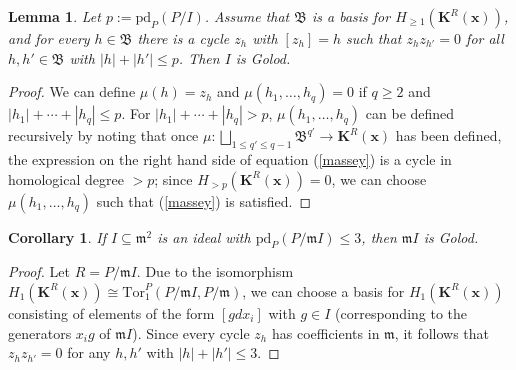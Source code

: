 \documentclass[10pt,reqno]{amsart}
\newtheorem{lemma}[subsection]{Lemma}
\newtheorem{corollary}[subsection]{Corollary}
\theoremstyle{definition}
\theoremstyle{remark}
\numberwithin{equation}{section}
\newcommand{\m}{\mathfrak m}
\numberwithin{equation}{section}
\begin{document}
\begin{lemma}\label{trivialmassey1}
Let $p:=\mathrm{pd}_P(P/I)$. Assume that $\mathfrak B$ is a basis for $H_{\ge 1}(\mathbf{K}^{R}(\mathbf{x}))$, and for every $h\in \mathfrak B$ there is a cycle $z_h$ with $[z_h]=h$ such that $z_hz_{h'}=0$ for all $h, h'\in \mathfrak B$ with $|h|+|h'|\le p$.
 Then $I$ is Golod.
\end{lemma}
\begin{proof}
 We can define $\mu(h)=z_h$ and $\mu(h_1, \ldots, h_q)=0$ if $q\ge 2$ and $|h_1|+\cdots + |h_q|\le p$. For $|h_1|+\cdots + |h_q|>p$, $\mu(h_1, \ldots, h_q)$ can be defined recursively by noting that once $\displaystyle \mu: \bigsqcup_{1\le q'\le q-1}\mathfrak B^{q'}\to \mathbf{K}^{R}(\mathbf{x})$ has been defined, the expression on the right hand side of equation (\ref{massey}) is a cycle in homological degree $>p$; since $H_{>p}(\mathbf{K}^{R}(\mathbf{x}))=0$, we can choose $\mu(h_1, \ldots, h_q)$ such that (\ref{massey}) is satisfied.
\end{proof}

\begin{corollary}
If $I\subseteq \m^2$ is an ideal with $\mathrm{pd}_P(P/\m I)\le 3$, then $\mathfrak m I$ is Golod.  
\end{corollary}
\begin{proof}
Let $R=P/\mathfrak m I$. Due to the isomorphism $H_1(\mathbf{K}^{R}(\mathbf{x}))\cong \mathrm{Tor}_1^P(P/\m I, P/\mathfrak m)$, we can choose a basis for $H_1(\mathbf{K}^{R}(\mathbf{x}))$
consisting of elements of the form $[gdx_i]$ with $g\in I$ (corresponding to the generators $x_ig$ of $\mathfrak m I$).
 Since every cycle $z_h$ has coefficients in $\m$, it follows that $z_hz_{h'}=0$ for any $h, h'$ with $|h|+|h'|\le 3$.
 
 \end{proof}



 
\end{document}
